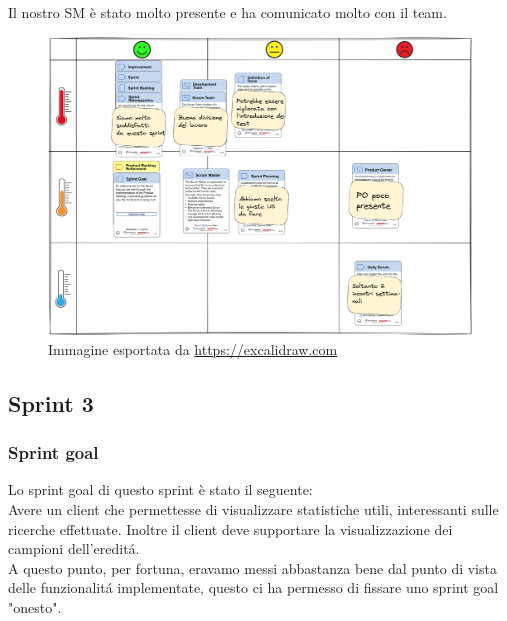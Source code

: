\documentclass{article}
\begin{document}
Il nostro SM \`e stato molto presente e ha comunicato molto con il team.
\begin{figure}[H]
    \centering
    \includegraphics[scale=0.065]{retrospettive/retrospettiva-sprint2.png}
    \caption{Immagine esportata da \href{https://excalidraw.com/}{https://excalidraw.com}}
    \label{fig:retrospettiva2}
\end{figure}
\subsection{Sprint 3}
\subsubsection{Sprint goal}
Lo sprint goal di questo sprint \`e stato il seguente: \\
Avere un client che permettesse di visualizzare statistiche utili, interessanti sulle ricerche effettuate. Inoltre il client deve supportare la visualizzazione dei campioni dell'eredit\'a. \\
A questo punto, per fortuna, eravamo messi abbastanza bene dal punto di vista delle funzionalit\'a implementate, questo ci ha permesso di fissare uno sprint goal "onesto".
\end{document}
